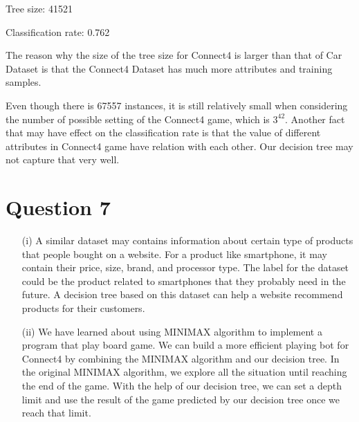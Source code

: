 \documentclass[letterpaper]{article}
\begin{document}
\begin{enumerate}
	Tree size: 41521
	
	Classification rate: 0.762
	
	The reason why the size of the tree size for Connect4 is larger than that of Car Dataset is that the Connect4 Dataset has much more attributes and training samples.
	
	Even though there is 67557 instances, it is still relatively small when considering the number of possible setting of the Connect4 game, which is $3^{42}$. Another fact that may have effect on the classification rate is that the value of different attributes in Connect4 game have relation with each other. Our decision tree may not capture that very well.
\end{enumerate}
\section*{Question 7}
\begin{enumerate}
	\item [(i)]
	A similar dataset may contains information about certain type of products that people bought on a website. For a product like smartphone, it may contain their price, size, brand, and processor type. The label for the dataset could be the product related to smartphones that they probably need in the future. A decision tree based on this dataset can help a website recommend products for their customers.
	
	\item [(ii)]
	We have learned about using MINIMAX algorithm to implement a program that play board game. We can build a more efficient playing bot for Connect4 by combining the MINIMAX algorithm and our decision tree. In the original MINIMAX algorithm, we explore all the situation until reaching the end of the game. With the help of our decision tree, we can set a depth limit and use the result of the game predicted by our decision tree once we reach that limit.
\end{enumerate}
\end{document}
